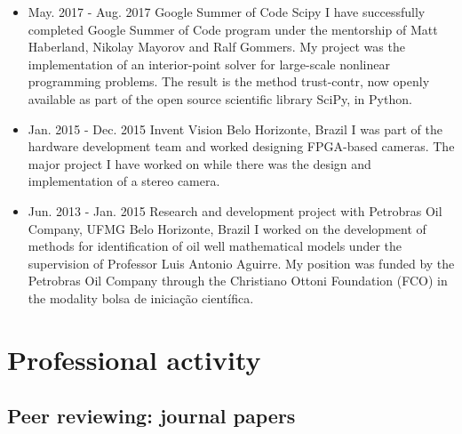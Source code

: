 \documentclass[10pt,A4]{article} %
\begin{document}
\begin{itemize}

    \item {}
    { May. 2017 -   Aug. 2017 }
    { Google Summer of Code }
    { Scipy }
    { I have successfully completed Google Summer of Code program under the mentorship of Matt Haberland, Nikolay Mayorov and Ralf Gommers. My project was the implementation of an interior-point solver for large-scale nonlinear programming problems. The result is the method trust-contr, now openly available as part of the open source scientific library SciPy, in Python. }

    \item {}
    { Jan. 2015 -   Dec. 2015 }
    { Invent Vision }
    { Belo Horizonte, Brazil }
    { I was part of the hardware development team and worked designing FPGA-based cameras. The major project I have worked on while there was the design and implementation of a stereo camera. }

    \item {}
    { Jun. 2013 -   Jan. 2015 }
    { Research and development project with Petrobras Oil Company, UFMG }
    { Belo Horizonte, Brazil }
    { I worked on the development of methods for identification of oil well mathematical models under the supervision of Professor Luis Antonio Aguirre. My position was funded by the Petrobras Oil Company through the Christiano Ottoni Foundation (FCO) in the modality bolsa de iniciação científica. }

\end{itemize}


\section{Professional activity}

\subsection{Peer reviewing: journal papers}
\end{document}
